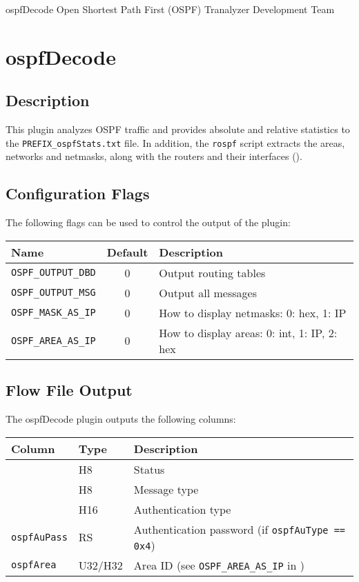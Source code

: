 \documentclass[documentation]{subfiles}
\begin{document}
\trantitle
    {ospfDecode}
    {Open Shortest Path First (OSPF)}
    {Tranalyzer Development Team}

\section{ospfDecode}\label{s:ospfDecode}

\subsection{Description}
This plugin analyzes OSPF traffic and provides absolute and relative statistics to the {\tt PREFIX\_ospfStats.txt} file. In addition, the {\tt rospf} script extracts the areas, networks and netmasks, along with the routers and their interfaces ().

\subsection{Configuration Flags}\label{s:ospf-of}
The following flags can be used to control the output of the plugin:
\begin{longtable}{lcl}
    \toprule
    {\bf Name} & {\bf Default} & {\bf Description} \\
    \midrule\endhead%
    {\tt OSPF\_OUTPUT\_DBD}  & 0 & Output routing tables\\
    {\tt OSPF\_OUTPUT\_MSG}  & 0 & Output all messages\\
    {\tt OSPF\_MASK\_AS\_IP} & 0 & How to display netmasks: 0: hex, 1: IP\\
    {\tt OSPF\_AREA\_AS\_IP} & 0 & How to display areas: 0: int, 1: IP, 2: hex\\
    \bottomrule
\end{longtable}

\subsection{Flow File Output}
The ospfDecode plugin outputs the following columns:
\begin{longtable}{lll}
    \toprule
    {\bf Column} & {\bf Type} & {\bf Description} \\
    \midrule\endhead%
    {\tt \nameref{ospfStat}}   & H8      & Status\\
    {\tt \nameref{ospfType}}   & H8      & Message type\\
    {\tt \nameref{ospfAuType}} & H16     & Authentication type\\
    {\tt ospfAuPass} & RS      & Authentication password (if {\tt ospfAuType == 0x4})\\
    {\tt ospfArea}   & U32/H32 & Area ID (see {\tt OSPF\_AREA\_AS\_IP} in {s:ospf-of})\\
    \bottomrule
\end{longtable}
\end{document}
